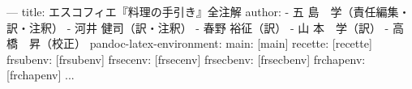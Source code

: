 ---
title: エスコフィエ『料理の手引き』全注解
author:
- 五 島　学（責任編集・訳・注釈）
- 河井 健司（訳・注釈）
- 春野 裕征（訳）
- 山 本　学（訳）
- 高 橋　昇（校正）
pandoc-latex-environment:
    main: [main]
    recette: [recette]
    frsubenv: [frsubenv]
    frsecenv: [frsecenv]
    frsecbenv: [frsecbenv]
    frchapenv: [frchapenv]
...








\appendix


\backmatter

\renewcommand{\indexname}{ソース名から料理を探す}

\printindex[src][ソース名から料理を探す]

\renewcommand{\indexname}{総索引}
\printindex
